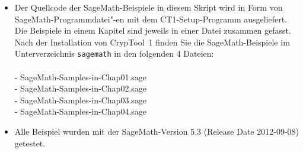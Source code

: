 \vspace{30pt}
\begin{itemize}
  \item Der Quellcode der SageMath-Beispiele in diesem Skript wird in Form von
        SageMath-Programmdatei"-en mit dem CT1-Setup-Programm ausgeliefert.
        Die Beispiele in einem Kapitel sind jeweils in einer Datei zusammen gefasst.\\
        Nach der Installation von CrypTool~1  finden Sie
        die SageMath-Beispiele im Unterverzeichnis \verb#sagemath# in den folgenden
        4 Dateien:\\\\%
        - SageMath-Samples-in-Chap01.sage \\
        - SageMath-Samples-in-Chap02.sage \\
        - SageMath-Samples-in-Chap03.sage \\
        - SageMath-Samples-in-Chap04.sage
  \item Alle Beispiel wurden mit der SageMath-Version 5.3 (Release Date 2012-09-08) getestet.
\end{itemize}   %


\printbibliography[heading=bibintoc,
title={Gesamtliteraturverzeichnis}]


\clearpage{}


